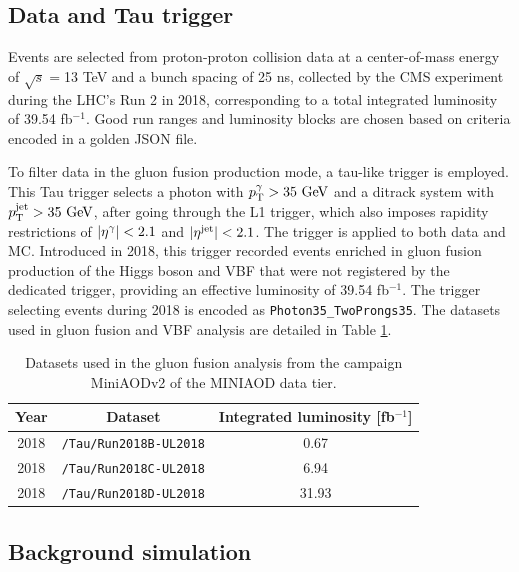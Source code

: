 \subsection{Data and Tau trigger}

Events are selected from proton-proton collision data at a center-of-mass energy of $\sqrt{s}=$13 TeV and a bunch spacing of 25 ns, collected by the CMS experiment during the LHC's Run 2 in 2018, corresponding to a total integrated luminosity of 39.54 fb$^{-1}$. Good run ranges and luminosity blocks are chosen based on criteria encoded in a golden JSON file.

To filter data in the gluon fusion production mode, a tau-like trigger is employed. This Tau trigger selects a photon with $p_\text{T}^{\gamma} > 35\ \text{GeV}$ and a ditrack system with $\pT^{\text{jet}} > 35\ \GeV$, after going through the L1 trigger, which also imposes rapidity restrictions of $\left\lvert\eta^{\gamma}\right\rvert<2.1$ and $\left\lvert\eta^{\text{jet}}\right\rvert<2.1$. The trigger is applied to both data and MC. Introduced in 2018, this trigger recorded events enriched in gluon fusion production of the Higgs boson and VBF that were not registered by the dedicated trigger, providing an effective luminosity of 39.54 fb$^{-1}$. The trigger selecting events during 2018 is encoded as \verb+Photon35_TwoProngs35+.  The datasets used in gluon fusion and VBF analysis are detailed in Table \ref{tab:ggH_datasets}.

\begin{table}[ht]
    \centering
    \begin{tabular}{|c|c|c|}
        \hline
        \multicolumn{1}{|c|}{\cellcolor{lightgray}Year} & \cellcolor{lightgray}Dataset & \cellcolor{lightgray}Integrated luminosity [fb$^{-1}$] \\ \hline
        2018    & \verb+/Tau/Run2018B-UL2018+  & 0.67 \\
        2018    & \verb+/Tau/Run2018C-UL2018+  & 6.94 \\
        2018    & \verb+/Tau/Run2018D-UL2018+  & 31.93 \\ \hline
    \end{tabular}
    \caption{Datasets used in the gluon fusion analysis from the campaign MiniAODv2 of the MINIAOD data tier.}
    \label{tab:ggH_datasets}
\end{table}

\subsection{Background simulation}

